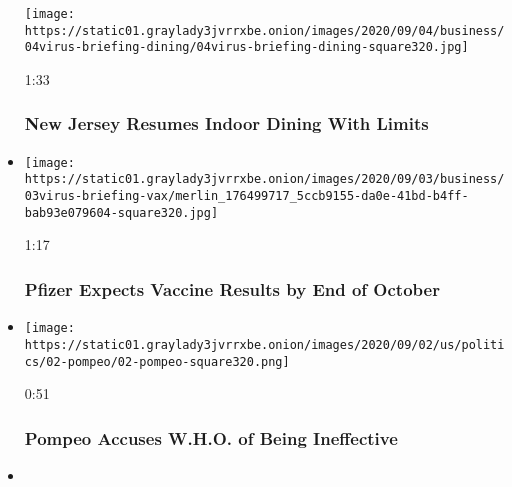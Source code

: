 \begin{itemize}
  \texttt{[image: https://static01.graylady3jvrrxbe.onion/images/2020/09/04/business/04virus-briefing-dining/04virus-briefing-dining-square320.jpg]}

  1:33

  \hypertarget{new-jersey-resumes-indoor-dining-with-limits}{%
  \subsubsection{New Jersey Resumes Indoor Dining With
  Limits}\label{new-jersey-resumes-indoor-dining-with-limits}}
\item
  \href{https://www.nytimes3xbfgragh.onion/video/us/politics/100000007323276/pfizer-coronavirus-vaccine-october.html?action=click\&module=video-series-bar\&region=header\&pgtype=Article\&playlistId=video/coronavirus-news-update}{}

  \texttt{[image: https://static01.graylady3jvrrxbe.onion/images/2020/09/03/business/03virus-briefing-vax/merlin\_176499717\_5ccb9155-da0e-41bd-b4ff-bab93e079604-square320.jpg]}

  1:17

  \hypertarget{pfizer-expects-vaccine-results-by-end-of-october}{%
  \subsubsection{Pfizer Expects Vaccine Results by End of
  October}\label{pfizer-expects-vaccine-results-by-end-of-october}}
\item
  \href{https://www.nytimes3xbfgragh.onion/video/us/politics/100000007320987/pompeo-who-coronavirus-vaccine.html?action=click\&module=video-series-bar\&region=header\&pgtype=Article\&playlistId=video/coronavirus-news-update}{}

  \texttt{[image: https://static01.graylady3jvrrxbe.onion/images/2020/09/02/us/politics/02-pompeo/02-pompeo-square320.png]}

  0:51

  \hypertarget{pompeo-accuses-who-of-being-ineffective}{%
  \subsubsection{Pompeo Accuses W.H.O. of Being
  Ineffective}\label{pompeo-accuses-who-of-being-ineffective}}
\item
  \href{https://www.nytimes3xbfgragh.onion/video/world/europe/100000007320740/who-steroid-guidelines-coronavirus.html?action=click\&module=video-series-bar\&region=header\&pgtype=Article\&playlistId=video/coronavirus-news-update}{}


\end{itemize}
